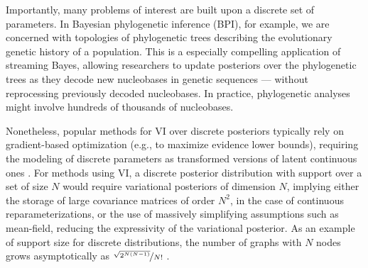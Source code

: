 \documentclass{article}
\theoremstyle{plain}
\theoremstyle{definition}
\theoremstyle{remark}
\theoremstyle{remark}
\begin{document}
Importantly, many problems of interest are built upon a discrete set of parameters. In Bayesian phylogenetic inference (BPI), for example, we are concerned with topologies of phylogenetic trees describing the evolutionary genetic history of a population. %
This is a especially compelling application of streaming Bayes, allowing researchers to update posteriors over the phylogenetic trees as they decode new nucleobases in genetic sequences --- without reprocessing previously decoded nucleobases. %
In practice, phylogenetic analyses might involve hundreds of thousands of nucleobases.  


Nonetheless, popular methods for VI over discrete posteriors typically rely on gradient-based optimization (e.g., to maximize evidence lower bounds), requiring the modeling of discrete parameters as transformed versions of latent continuous ones \cite{jang2017categorical, maddison2017the, han2020stein}.
% 
For methods using VI, a discrete posterior distribution with support over a set of size $N$ would require variational posteriors of dimension $N$, implying either the storage of large covariance matrices of order $N^2$, in the case of continuous reparameterizations, or the use of massively simplifying assumptions such as mean-field, reducing the expressivity of the variational posterior. As an example of support size for discrete distributions, the number of graphs with $N$ nodes grows asymptotically as $\nicefrac{\sqrt{2^{N(N - 1)}}}{N!}$ \citep{Flajolet2009}.

\end{document}
